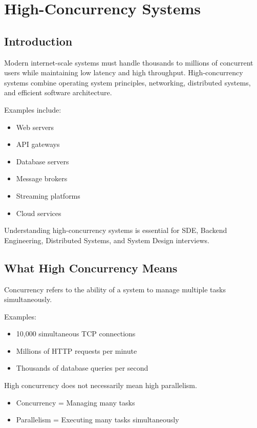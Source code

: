 \chapter{High-Concurrency Systems}

\section{Introduction}

Modern internet-scale systems must handle thousands to millions of concurrent users while maintaining low latency and high throughput. High-concurrency systems combine operating system principles, networking, distributed systems, and efficient software architecture.

Examples include:

\begin{itemize}
\item Web servers
\item API gateways
\item Database servers
\item Message brokers
\item Streaming platforms
\item Cloud services
\end{itemize}

Understanding high-concurrency systems is essential for SDE, Backend Engineering, Distributed Systems, and System Design interviews.

\section{What High Concurrency Means}

Concurrency refers to the ability of a system to manage multiple tasks simultaneously.

Examples:

\begin{itemize}
\item 10,000 simultaneous TCP connections
\item Millions of HTTP requests per minute
\item Thousands of database queries per second
\end{itemize}

High concurrency does not necessarily mean high parallelism.

\begin{itemize}
\item Concurrency = Managing many tasks
\item Parallelism = Executing many tasks simultaneously
\end{itemize}

